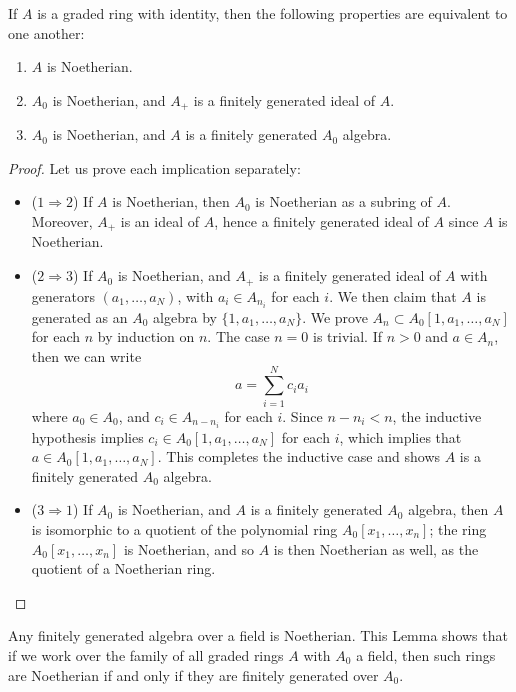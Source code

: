 \begin{theorem}
    If $A$ is a graded ring with identity, then the following properties are equivalent to one another:
    \begin{enumerate}
        \item $A$ is Noetherian.
        \item $A_0$ is Noetherian, and $A_+$ is a finitely generated ideal of $A$.
        \item $A_0$ is Noetherian, and $A$ is a finitely generated $A_0$ algebra.
    \end{enumerate}
\end{theorem}
\begin{proof}
    Let us prove each implication separately:
    \begin{itemize}
        \item ($1 \Rightarrow 2$) If $A$ is Noetherian, then $A_0$ is Noetherian as a subring of $A$. Moreover, $A_+$ is an ideal of $A$, hence a finitely generated ideal of $A$ since $A$ is Noetherian.

        \item ($2 \Rightarrow 3$) If $A_0$ is Noetherian, and $A_+$ is a finitely generated ideal of $A$ with generators $(a_1, \dots, a_N)$, with $a_i \in A_{n_i}$ for each $i$. We then claim that $A$ is generated as an $A_0$ algebra by $\{ 1, a_1, \dots, a_N \}$. We prove $A_n \subset A_0[1,a_1,\dots,a_N]$ for each $n$ by induction on $n$. The case $n = 0$ is trivial. If $n > 0$ and $a \in A_n$, then we can write
        \[ a = \sum_{i = 1}^N c_i a_i \]
        where $a_0 \in A_0$, and $c_i \in A_{n - n_i}$ for each $i$. Since $n - n_i < n$, the inductive hypothesis implies $c_i \in A_0[1,a_1,\dots,a_N]$ for each $i$, which implies that $a \in A_0[1,a_1,\dots,a_N]$. This completes the inductive case and shows $A$ is a finitely generated $A_0$ algebra.

        \item ($3 \Rightarrow 1$) If $A_0$ is Noetherian, and $A$ is a finitely generated $A_0$ algebra, then $A$ is isomorphic to a quotient of the polynomial ring $A_0[x_1,\dots,x_n]$; the ring $A_0[x_1,\dots,x_n]$ is Noetherian, and so $A$ is then Noetherian as well, as the quotient of a Noetherian ring. $\qedhere$
    \end{itemize}
\end{proof}

\begin{remark}
    Any finitely generated algebra over a field is Noetherian. This Lemma shows that if we work over the family of all graded rings $A$ with $A_0$ a field, then such rings are Noetherian if and only if they are finitely generated over $A_0$.
\end{remark}

